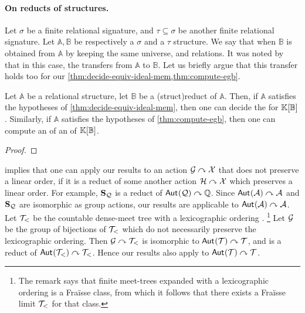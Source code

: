\paragraph{On reducts of structures.} \AP Let $\sigma$ be a finite relational
signature, and $\tau \subseteq \sigma$ be another finite relational signature.
Let $\mathbb{A}, \mathbb{B}$ be respectively a $\sigma$ and a $\tau$ structure. We say
that  when $\mathbb{B}$ is
obtained from $\mathbb{A}$ by keeping the same universe, and relations. It was noted by \cite[Lemma 13]{GHOLAS24} that in
this case, the  transfers from
$\mathbb{A}$ to $\mathbb{B}$. Let us briefly argue that this transfer holds too
for our \cref{thm:decide-equiv-ideal-mem,thm:compute-egb}.


\begin{lemma}\label{lem:reducts-equiv-hilbert}
  Let $\mathbb{A}$ be a relational structure, let $\mathbb{B}$ be a 
  \kl(struct){reduct} of $\mathbb{A}$. Then, if $\mathbb{A}$ satisfies the
  hypotheses of \cref{thm:decide-equiv-ideal-mem},
  then one can decide the  for
  $\mathbb{K}[\mathbb{B}]$. Similarly, 
  if $\mathbb{A}$ satisfies the hypotheses of
  \cref{thm:compute-egb}, then one can compute an
   of an
   of $\mathbb{K}[\mathbb{B}]$.
\end{lemma}
\begin{proof}
\end{proof}

\AP 
%
\begin{remark}
 implies that one can apply our results to an action $\mathcal{G}\curvearrowright\mathcal{X}$ that does not preserve a linear order,
if it is a reduct of some another action $\mathcal{H}\curvearrowright\mathcal{X}$ which preserves a linear order.
For example, $\mathbf{S}_{\mathcal{Q}}$ is a reduct of $\mathsf{Aut}_{}{(\mathcal{Q})}\curvearrowright\mathbb{Q}$.
Since $\mathsf{Aut}_{}{(\mathcal{A})}\curvearrowright\mathcal{A}$ and $\mathbf{S}_{\mathcal{Q}}$ are isomorphic as group actions,
our results are applicable to $\mathsf{Aut}_{}{(\mathcal{A})}\curvearrowright\mathcal{A}$.
Let $\mathcal{T}_<$ be the countable dense-meet tree with a lexicographic ordering \cite[Remark 6.14]{KRS21}.
\footnote{The remark says that finite meet-trees expanded with a lexicographic ordering is a Fra\"{i}sse class,
from which it follows that there exists a Fra\"{i}sse limit $\mathcal{T}_<$ for that class.}
Let $\mathcal{G}$ be the group of bijections of $\mathcal{T}_<$ which do not necessarily preserve the lexicographic ordering.
Then $\mathcal{G}\curvearrowright\mathcal{T}_<$ is isomorphic to $\mathsf{Aut}_{}{(\mathcal{T})}\curvearrowright\mathcal{T}$,
and is a reduct of $\mathsf{Aut}_{}{(\mathcal{T}_<)}\curvearrowright\mathcal{T}_<$.
Hence our results also apply to $\mathsf{Aut}_{}{(\mathcal{T})}\curvearrowright\mathcal{T}$.
\end{remark}
%
